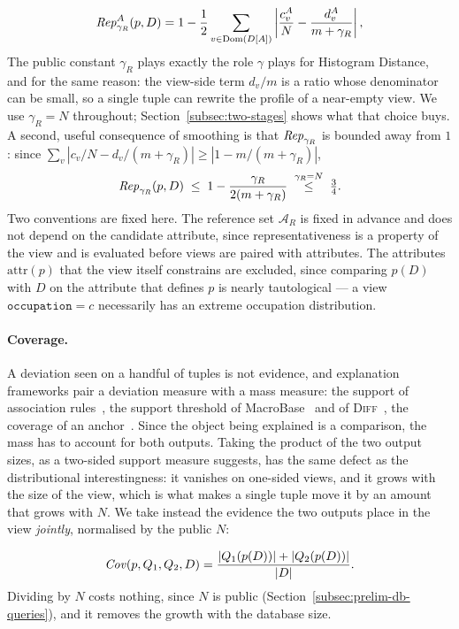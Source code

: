 \begin{equation}
\mathit{Rep}^A_{\gamma_R}(p,D)=1-\frac{1}{2}\sum_{v\in\operatorname{Dom}(D[A])}\left|\frac{c^A_v}{N}-\frac{d^A_v}{m+\gamma_R}\right| ,
\label{eq:representativeness-proxy}
\end{equation}
The public constant $\gamma_R$ plays exactly the role $\gamma$ plays for Histogram Distance, and for the same reason: the view-side term $d_v/m$ is a ratio whose denominator can be small, so a single tuple can rewrite the profile of a near-empty view.
We use $\gamma_R=N$ throughout; Section~\ref{subsec:two-stages} shows what that choice buys.
A second, useful consequence of smoothing is that $\mathit{Rep}_{\gamma_R}$ is bounded away from $1$: since $\sum_v|c_v/N-d_v/(m+\gamma_R)|\ge|1-m/(m+\gamma_R)|$,
\begin{equation}
\mathit{Rep}_{\gamma_R}(p,D)\;\le\;1-\frac{\gamma_R}{2(m+\gamma_R)}\;\overset{\gamma_R=N}{\le}\;\tfrac{3}{4}.
\label{eq:rep-upper}
\end{equation}
Two conventions are fixed here.
The reference set $\mathcal{A}_R$ is fixed in advance and does not depend on the candidate attribute, since representativeness is a property of the view and is evaluated before views are paired with attributes.
The attributes $\mathrm{attr}(p)$ that the view itself constrains are excluded, since comparing $p(D)$ with $D$ on the attribute that defines $p$ is nearly tautological --- a view $\texttt{occupation}=c$ necessarily has an extreme occupation distribution.

\paragraph{Coverage.}
A deviation seen on a handful of tuples is not evidence, and explanation frameworks pair a deviation measure with a mass measure: the support of association rules~\cite{AgrawalIS93}, the support threshold of MacroBase~\cite{MacroBase} and of \textsc{Diff}~\cite{DIFF}, the coverage of an anchor~\cite{Anchors}.
Since the object being explained is a comparison, the mass has to account for both outputs.
Taking the product of the two output sizes, as a two-sided support measure suggests, has the same defect as the distributional interestingness: it vanishes on one-sided views, and it grows with the size of the view, which is what makes a single tuple move it by an amount that grows with $N$.
We take instead the evidence the two outputs place in the view \emph{jointly}, normalised by the public $N$:

\begin{equation}
\mathit{Cov}(p,Q_1,Q_2,D)=\frac{|Q_1(p(D))|+|Q_2(p(D))|}{|D|}.
\label{eq:coverage-proxy}
\end{equation}
Dividing by $N$ costs nothing, since $N$ is public (Section~\ref{subsec:prelim-db-queries}), and it removes the growth with the database size.


